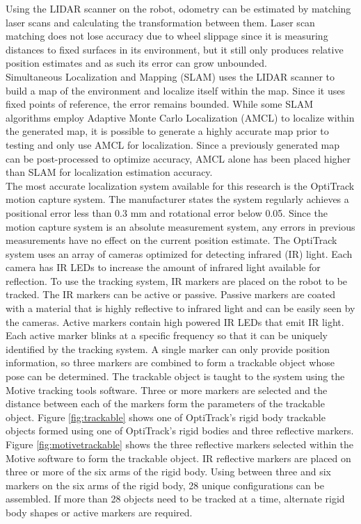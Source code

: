 Using the LIDAR scanner on the robot, odometry can be estimated by matching laser scans and calculating the transformation between them. Laser scan matching does not lose accuracy due to wheel slippage since it is measuring distances to fixed surfaces in its environment, but it still only produces relative position estimates and as such its error can grow unbounded.\\

Simultaneous Localization and Mapping (SLAM) uses the LIDAR scanner to build a map of the environment and localize itself within the map. Since it uses fixed points of reference, the error remains bounded. While some SLAM algorithms employ Adaptive Monte Carlo Localization (AMCL) to localize within the generated map, it is possible to generate a highly accurate map prior to testing and only use AMCL for localization. Since a previously generated map can be post-processed to optimize accuracy, AMCL alone has been placed higher than SLAM for localization estimation accuracy.\\

The most accurate localization system available for this research is the OptiTrack motion capture system. The manufacturer states the system regularly achieves a positional error less than 0.3 mm and rotational error below 0.05\degree. Since the motion capture system is an absolute measurement system, any errors in previous measurements have no effect on the current position estimate. The OptiTrack system uses an array of cameras optimized for detecting infrared (IR) light. Each camera has IR LEDs to increase the amount of infrared light available for reflection. To use the tracking system, IR markers are placed on the robot to be tracked. The IR markers can be active or passive. Passive markers are coated with a material that is highly reflective to infrared light and can be easily seen by the cameras. Active markers contain high powered IR LEDs that emit IR light. Each active marker blinks at a specific frequency so that it can be uniquely identified by the tracking system. A single marker can only provide position information, so three markers are combined to form a trackable object whose pose can be determined. The trackable object is taught to the system using the Motive tracking tools software. Three or more markers are selected and the distance between each of the markers form the parameters of the trackable object. Figure \ref{fig:trackable} shows one of OptiTrack's rigid body trackable objects formed using one of OptiTrack's rigid bodies and three reflective markers. Figure \ref{fig:motivetrackable} shows the three reflective markers selected within the Motive software to form the trackable object. IR reflective markers are placed on three or more of the six arms of the rigid body. Using between three and six markers on the six arms of the rigid body, 28 unique configurations can be assembled. If more than 28 objects need to be tracked at a time, alternate rigid body shapes or active markers are required.\\

